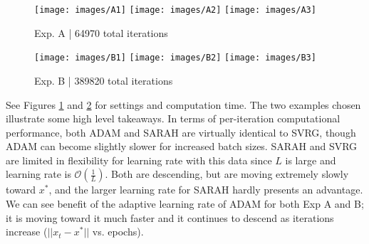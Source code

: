 \documentclass[letterpaper,11 pt]{article}
\begin{document}
\begin{figure}[htb]
\begin{centering}
\texttt{[image: images/A1]}
\texttt{[image: images/A2]} 
\texttt{[image: images/A3]}
\end{centering}
\begin{centering}
\end{centering}
\caption{Exp. A | 64970 total iterations}
\label{fig1}
\end{figure}
\begin{figure}[htb]
\begin{centering}
\centering
\texttt{[image: images/B1]}
\texttt{[image: images/B2]} 
\texttt{[image: images/B3]}
\end{centering}
\begin{centering}
\centering
\end{centering}
\caption{Exp. B | 389820 total iterations}
\label{fig2}
\end{figure}

See Figures \ref{fig1} and \ref{fig2} for settings and computation time. The two examples chosen illustrate some high level takeaways. In terms of per-iteration computational performance, both ADAM and SARAH are virtually identical to SVRG, though ADAM can become slightly slower for increased batch sizes. SARAH and SVRG are limited in flexibility for learning rate with this data since $L$ is large and learning rate is $\mathcal{O}(\frac{1}{L})$. Both are descending, but are moving extremely slowly toward $x^*$, and the larger learning rate for SARAH hardly presents an advantage. We can see benefit of the adaptive learning rate of ADAM for both Exp A and B; it is moving toward it much faster and it continues to descend as iterations increase ($||x_t-x^*||$ vs. epochs).
\end{document}
